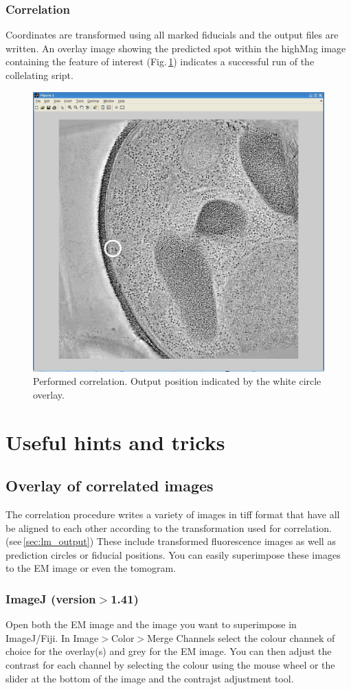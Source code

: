 \documentclass[10pt,a4paper,onepage,DIV12]{scrartcl}
\begin{document}
\subsubsection{Correlation}
Coordinates are transformed using all marked fiducials and the output files are written. An overlay image showing the predicted spot within the highMag image containing the feature of interest (Fig.\,\ref{fig:tfm_HM}) indicates a successful run of the collelating sript.
\begin{figure}[h!]
 \centering
 \includegraphics[width=.5\textwidth]{images/tfm_HM.jpg}
 \caption{Performed correlation. Output position indicated by the white circle overlay.}
 \label{fig:tfm_HM}
\end{figure}
\newpage
\section{Useful hints and tricks}
\subsection{Overlay of correlated images}
The correlation procedure writes a variety of images in tiff format that have all be aligned to each other according to the transformation used for correlation. (see\,\ref{sec:lm_output}) These include transformed fluorescence images as well as prediction circles or fiducial positions.
You can easily superimpose these images to the EM image or even the tomogram.

\subsubsection*{ImageJ (version$>$1.41)}
Open both the EM image and the image you want to superimpose in ImageJ/Fiji. In Image$>$Color$>$Merge Channels select the colour channek of choice for the overlay(s) and grey for the EM image. You can then adjust the contrast for each channel by selecting the colour using the mouse wheel or the slider at the bottom of the image and the contrajst adjustment tool.
\end{document}
